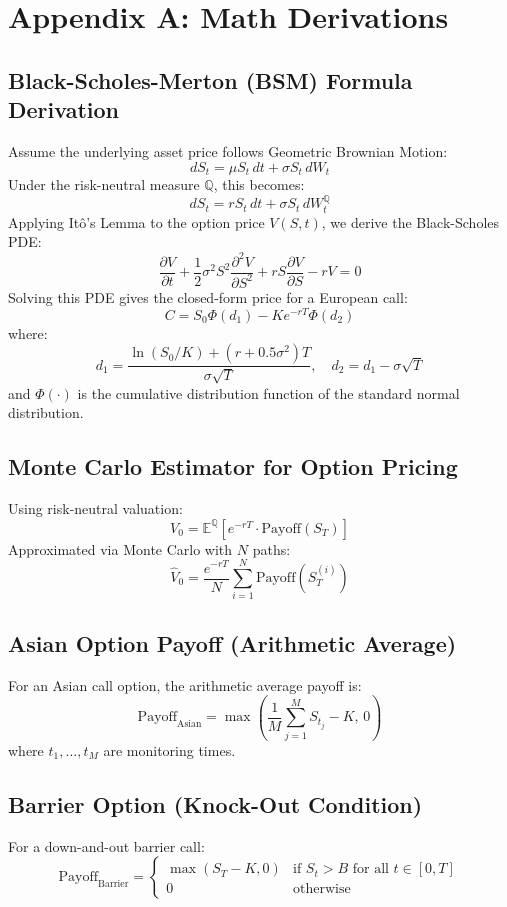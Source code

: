 \documentclass[12pt,a4paper]{article}
\begin{document}
\appendix
\section{Appendix A: Math Derivations}

\subsection{Black-Scholes-Merton (BSM) Formula Derivation}
Assume the underlying asset price follows Geometric Brownian Motion:
\[
dS_t = \mu S_t \, dt + \sigma S_t \, dW_t
\]
Under the risk-neutral measure \(\mathbb{Q}\), this becomes:
\[
dS_t = r S_t \, dt + \sigma S_t \, dW_t^{\mathbb{Q}}
\]
Applying Itô’s Lemma to the option price \(V(S,t)\), we derive the Black-Scholes PDE:
\[
\frac{\partial V}{\partial t} + \frac{1}{2} \sigma^2 S^2 \frac{\partial^2 V}{\partial S^2} + r S \frac{\partial V}{\partial S} - rV = 0
\]
Solving this PDE gives the closed-form price for a European call:
\[
C = S_0 \Phi(d_1) - K e^{-rT} \Phi(d_2)
\]
where:
\[
d_1 = \frac{\ln(S_0 / K) + (r + 0.5 \sigma^2)T}{\sigma \sqrt{T}}, \quad d_2 = d_1 - \sigma \sqrt{T}
\]
and \(\Phi(\cdot)\) is the cumulative distribution function of the standard normal distribution.

\subsection{Monte Carlo Estimator for Option Pricing}
Using risk-neutral valuation:
\[
V_0 = \mathbb{E}^{\mathbb{Q}} \left[ e^{-rT} \cdot \text{Payoff}(S_T) \right]
\]
Approximated via Monte Carlo with \(N\) paths:
\[
\hat{V}_0 = \frac{e^{-rT}}{N} \sum_{i=1}^N \text{Payoff}(S_T^{(i)})
\]

\subsection{Asian Option Payoff (Arithmetic Average)}
For an Asian call option, the arithmetic average payoff is:
\[
\text{Payoff}_{\text{Asian}} = \max\left( \frac{1}{M} \sum_{j=1}^M S_{t_j} - K,\, 0 \right)
\]
where \(t_1, \dots, t_M\) are monitoring times.

\subsection{Barrier Option (Knock-Out Condition)}
For a down-and-out barrier call:
\[
\text{Payoff}_{\text{Barrier}} = 
\begin{cases}
\max(S_T - K, 0) & \text{if } S_t > B \text{ for all } t \in [0, T] \\
0 & \text{otherwise}
\end{cases}
\]
\end{document}
